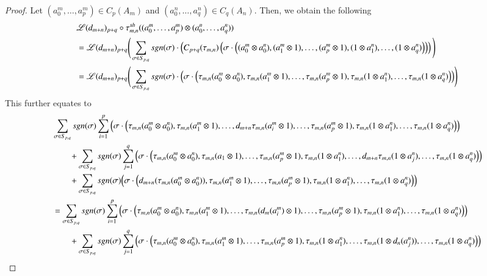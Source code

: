 \documentclass[10pt, colorlinks]{article}
\numberwithin{equation}{section} \DeclareMathSizes{2}{10}{12}{13}
\begin{document}
\begin{proof}
      \smallskip
     Let $(a^m_0,\ldots,a^m_p)\in C_p(A_m)$ and $(a^n_0,\ldots,a^n_q)\in C_q(A_n)$.
     Then, we obtain the following
      \begin{align*}
          &\mathscr{L}(d_{m+n})_{p+q}\circ \tau^{sh}_{m,n}((a^m_0,\ldots,a^m_p)\otimes (a^n_0,\ldots,a^n_q))\notag\\
          &=\mathscr{L}(d_{m+n})_{p+q}\Bigg(\sum_{\sigma\in S_{p,q}}sgn(\sigma)\cdot\left(C_{p+q}(\tau_{m,n})\left(\sigma\cdot\left((a^m_0\otimes a^n_0),(a^m_1\otimes 1),\ldots,(a^m_p\otimes 1),(1\otimes a^n_1),\ldots,(1\otimes a^n_q)\right)\right)\right)\Bigg)\notag\\
           &=\mathscr{L}(d_{m+n})_{p+q}\Bigg(\sum_{\sigma\in S_{p,q}}sgn(\sigma)\cdot\Big(\sigma\cdot\Big(\tau_{m,n}(a^m_0\otimes a^n_0),\tau_{m,n}(a^m_1\otimes 1),\ldots,\tau_{m,n}(a^m_p\otimes 1),\tau_{m,n}(1\otimes a^n_1),\ldots,\tau_{m,n}(1\otimes a^n_q)\Big)\Big)\Bigg)\notag\\
           \end{align*}
           This further equates to 
           \begin{align}
           &\sum_{\sigma\in S_{p,q}}sgn(\sigma)\sum_{i=1}^{p}\Big(\sigma\cdot\Big(\tau_{m,n}(a^m_0\otimes a^n_0),\tau_{m,n}(a^m_1\otimes 1),\ldots,d_{m+n}\tau_{m,n}(a^m_{i}\otimes 1),\ldots,\tau_{m,n}(a^m_p\otimes 1),\tau_{m,n}(1\otimes a^n_1),\ldots,\tau_{m,n}(1\otimes a^n_q)\Big)\Big)\notag\\
           &\qquad+\sum_{\sigma\in S_{p,q}}sgn(\sigma)\sum_{j=1}^{q}\Big(\sigma\cdot\Big(\tau_{m,n}(a^m_0\otimes a^n_0),\tau_{m,n}(a_1\otimes 1),\ldots,\tau_{m,n}(a^m_p\otimes 1),\tau_{m,n}(1\otimes a^n_1),\ldots,d_{m+n}\tau_{m,n}(1\otimes a^n_{j}),\ldots,\tau_{m,n}(1\otimes a^n_q)\Big)\Big)\notag\\
            &\qquad+\sum_{\sigma\in S_{p,q}}sgn(\sigma)\Big(\sigma\cdot\Big(d_{m+n}(\tau_{m,n}(a^m_0\otimes a_0^n)),\tau_{m,n}(a^m_1\otimes 1),\ldots,\tau_{m,n}(a^m_p\otimes 1),\tau_{m,n}(1\otimes a^n_1),\ldots,\tau_{m,n}(1\otimes a^n_q)\Big)\Big)\notag \\
           &=\sum_{\sigma\in S_{p,q}}sgn(\sigma)\sum_{i=1}^{p}\Big(\sigma\cdot\Big(\tau_{m,n}(a^m_0\otimes a^n_0),\tau_{m,n}(a^m_1\otimes 1),\ldots,\tau_{m,n}(d_{m}(a^m_{i})\otimes 1),\ldots,\tau_{m,n}(a^m_p\otimes 1),\tau_{m,n}(1\otimes a^n_1),\ldots,\tau_{m,n}(1\otimes a^n_q)\Big)\Big)\notag\\
           &\qquad+\sum_{\sigma\in S_{p,q}}sgn(\sigma)\sum_{j=1}^{q}\Big(\sigma\cdot\Big(\tau_{m,n}(a^m_0\otimes a^n_0),\tau_{m,n}(a^m_1\otimes 1),\ldots,\tau_{m,n}(a^m_p\otimes 1),\tau_{m,n}(1\otimes a^n_1),\ldots,\tau_{m,n}(1\otimes d_n(a_{j}^n)),\ldots,\tau_{m,n}(1\otimes a^n_q)\Big)\Big)\notag\\

\end{align}
\end{proof}
\end{document}
